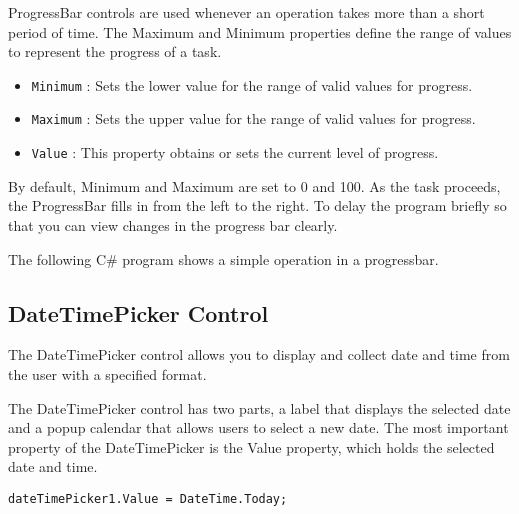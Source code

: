 ProgressBar controls are used whenever an operation takes more than a short period of time. The Maximum and Minimum properties define the range of values to represent the progress of a task.

\begin{itemize}

\item \verb*|Minimum| : Sets the lower value for the range of valid values for progress.

\item \verb*|Maximum| : Sets the upper value for the range of valid values for progress.

\item \verb*|Value| : This property obtains or sets the current level of progress.
\end{itemize}

By default, Minimum and Maximum are set to 0 and 100. As the task proceeds, the ProgressBar fills in from the left to the right. To delay the program briefly so that you can view changes in the progress bar clearly.

The following C\# program shows a simple operation in a progressbar.



\subsection{DateTimePicker Control}
The DateTimePicker control allows you to display and collect date and time from the user with a specified format.


The DateTimePicker control has two parts, a label that displays the selected date and a popup calendar that allows users to select a new date. The most important property of the DateTimePicker is the Value property, which holds the selected date and time.

\begin{lstlisting}[numbers=none]
dateTimePicker1.Value = DateTime.Today;
\end{lstlisting}

